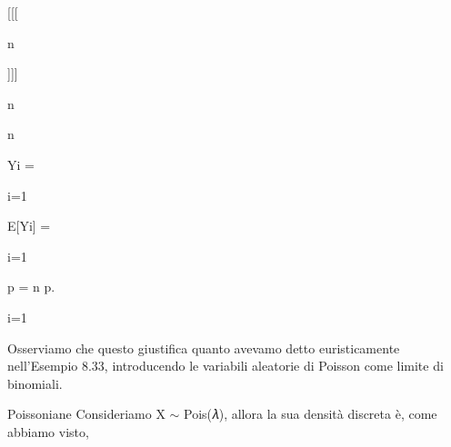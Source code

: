 \documentclass[a4paper,portrait,12pt]{article}
\begin{document}
[[[





\begin{flushleft}
n
\end{flushleft}





]]]





\begin{flushleft}
n
\end{flushleft}





\begin{flushleft}
n
\end{flushleft}





\begin{flushleft}
Yi =
\end{flushleft}


\begin{flushleft}
i=1
\end{flushleft}





\begin{flushleft}
E[Yi] =
\end{flushleft}


\begin{flushleft}
i=1
\end{flushleft}





\begin{flushleft}
p = n p.
\end{flushleft}


\begin{flushleft}
i=1
\end{flushleft}





\begin{flushleft}
Osserviamo che questo giustifica quanto avevamo detto euristicamente nell'Esempio 8.33, introducendo le variabili aleatorie di Poisson come limite di binomiali.
\end{flushleft}


\begin{flushleft}
Poissoniane Consideriamo X $\sim$ Pois(𝜆), allora la sua densit\`{a} discreta \`{e}, come abbiamo visto,
\end{flushleft}
\end{document}
